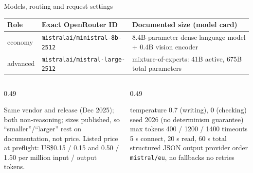 \begin{frame}{Models, routing and request settings}\label{frm:models}
  \scriptsize
  \renewcommand{\arraystretch}{1.2}
  \begin{tabular}{@{}l l p{}@{}}
    \toprule
    \textbf{Role} & \textbf{Exact OpenRouter ID} & \textbf{Documented size (model card)}\\
    \midrule
    economy & \texttt{mistralai/ministral-8b-2512} & 8.4B-parameter dense language model + 0.4B vision encoder\\
    advanced & \texttt{mistralai/mistral-large-2512} & mixture-of-experts: 41B active, 675B total parameters\\
    \bottomrule
  \end{tabular}\par
  \vspace{2mm}
  \begin{columns}[T,onlytextwidth]
    \begin{column}{0.49\textwidth}
      \begin{readme}
        Same vendor and release (Dec 2025); both non-reasoning; sizes published, so ``smaller''/``larger''
        rest on documentation, not price. Listed price at preflight: US\$0.15 / 0.15 and 0.50 / 1.50 per
        million input / output tokens.
      \end{readme}
    \end{column}
    \begin{column}{0.49\textwidth}
      \begin{numexample}
        temperature 0.7 (writing), 0 (checking) \textperiodcentered{} seed 2026 (no determinism guarantee)
        \textperiodcentered{} max tokens 400 / 1200 / 1400 \textperiodcentered{} timeouts 5 s connect, 20 s read, 60 s total
        \textperiodcentered{} structured JSON output \textperiodcentered{} provider order \texttt{mistral/eu},
        no fallbacks \textperiodcentered{} no retries
      \end{numexample}
    \end{column}
  \end{columns}
\end{frame}

